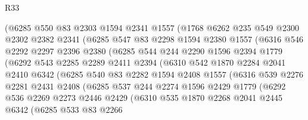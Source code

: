 \begin{lexlean}{R33}
\begin{coremodule}
            (@6285
              @550
              @83
              @2303
              @1594
              @2341
              @1557
              (@1768
                @6262
                @235
                @549
                @2300
                @2302
                @2382
                @2341
                (@6285
                  @547
                  @83
                  @2298
                  @1594
                  @2380
                  @1557
                  (@6316
                    @546
                    @2292
                    @2297
                    @2396
                    @2380
                    (@6285
                      @544
                      @244
                      @2290
                      @1596
                      @2394
                      @1779
                      (@6292
                        @543
                        @2285
                        @2289
                        @2411
                        @2394
                        (@6310
                          @542
                          @1870
                          @2284
                          @2041
                          @2410
                          @6342
                          (@6285
                            @540
                            @83
                            @2282
                            @1594
                            @2408
                            @1557
                            (@6316
                              @539
                              @2276
                              @2281
                              @2431
                              @2408
                              (@6285
                                @537
                                @244
                                @2274
                                @1596
                                @2429
                                @1779
                                (@6292
                                  @536
                                  @2269
                                  @2273
                                  @2446
                                  @2429
                                  (@6310
                                    @535
                                    @1870
                                    @2268
                                    @2041
                                    @2445
                                    @6342
                                    (@6285
                                      @533
                                      @83
                                      @2266

\end{coremodule}
\end{lexlean}
